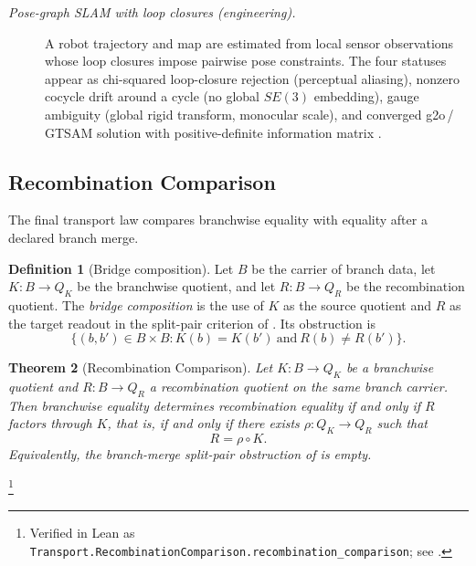 \documentclass[11pt]{article}
\newtheorem{theorem}{Theorem}[section]
\theoremstyle{definition}
\newtheorem{definition}[theorem]{Definition}
\begin{document}
\begin{description}
\item[\emph{Pose-graph SLAM with loop closures (engineering).}]
A robot trajectory and map are estimated from local sensor
observations whose loop closures impose pairwise pose constraints.
The four statuses appear as chi-squared loop-closure rejection
(perceptual aliasing), nonzero cocycle drift around a cycle (no
global \(SE(3)\) embedding), gauge ambiguity (global rigid
transform, monocular scale), and converged g2o\,/\,GTSAM solution
with positive-definite information matrix
\citep{Cadena2016SLAMSurvey}.
\end{description}

\subsection{Recombination Comparison}\label{sec:transport:recombination}

The final transport law compares branchwise equality with equality
after a declared branch merge.

\begin{definition}[Bridge composition]\label{def:bridge-composition}
Let \(B\) be the carrier of branch data, let \(K:B\to Q_K\) be the
branchwise quotient, and let \(R:B\to Q_R\) be the recombination
quotient.  The \emph{bridge composition} is the use of \(K\) as the
source quotient and \(R\) as the target readout in the split-pair
criterion of .  Its obstruction is
\[
  \{(b,b')\in B\times B:
      K(b)=K(b')\ \text{and}\ R(b)\ne R(b')\}.
\]
\end{definition}

\begin{theorem}[Recombination Comparison]\label{thm:F5}
Let \(K:B\to Q_K\) be a branchwise quotient and
\(R:B\to Q_R\) a recombination quotient on the same branch carrier.
Then branchwise equality determines recombination equality if and only
if \(R\) factors through \(K\), that is, if and only if there exists
\(\rho:Q_K\to Q_R\) such that
\[
  R=\rho\circ K .
\]
Equivalently, the branch-merge split-pair obstruction of
 is empty.
\end{theorem}
\footnote{Verified in Lean as
\texttt{Transport.RecombinationComparison.\allowbreak{}recombination\_comparison};
see .}
\end{document}

